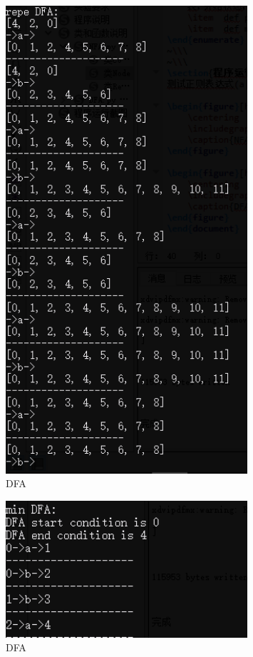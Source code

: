 \documentclass[]{article}
\begin{document}
\begin{figure}[h]
	\centering
	\includegraphics[width = 0.8\textwidth]{2.PNG}
	\caption{DFA}
\end{figure}

\begin{figure}[h]
	\centering
	\includegraphics[width = 0.8\textwidth]{3.PNG}
	\caption{DFA}
\end{figure}
\end{document}
